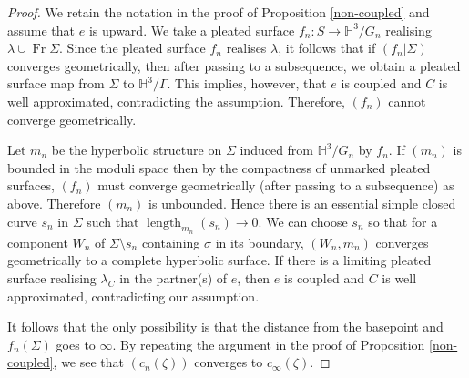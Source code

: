 \documentclass{amsart}
\theoremstyle{definition}
\newcommand{\Fr}{\operatorname{Fr}}
\newcommand\HHH{{\mathbb H}}
\newcommand\length{\operatorname{length}}
\begin{document}
\begin{proof}
We retain the notation in the proof of  Proposition \ref{non-coupled} and assume that $e$ is upward. 
We take a pleated surface $f_n\colon S \to \HHH^3/G_n$ realising $\lambda\cup \Fr \Sigma$.
Since the pleated surface $f_n$ realises $\lambda$, it follows that if $(f_n|\Sigma)$ converges geometrically, then after passing to a subsequence, we obtain a pleated surface map from $\Sigma$ to $\HHH^3/\Gamma$. This implies, however, that $e$ is coupled and $C$ is well approximated, contradicting the assumption.
Therefore, $(f_n)$ cannot converge geometrically.

Let $m_n$ be the hyperbolic structure on $\Sigma$ induced from $\HHH^3/G_n$ by $f_n$.
If $(m_n)$ is bounded in the moduli space then by the compactness of unmarked pleated surfaces, $(f_n)$ must converge geometrically  (after passing to a subsequence) as above.
Therefore $(m_n)$ is unbounded. Hence there is an essential simple closed curve $s_n$ in $\Sigma$ such that $\length_{m_n}(s_n) \to 0$.
We can choose  $s_n$ so that for a component $W_n$ of  $\Sigma \setminus s_n$ containing $\sigma$ in its boundary, $(W_n, m_n)$ converges geometrically to a complete hyperbolic surface.
If there is a limiting pleated surface realising $\lambda_C$ in the partner(s) of $e$, then $e$ is coupled and $C$ is well approximated, contradicting our assumption.


It follows that the only possibility is that  the distance from the basepoint and $f_n(\Sigma)$ goes to $\infty$.
By repeating the argument in the proof of Proposition \ref{non-coupled}, we see that $(c_n(\zeta))$ converges to $c_\infty(\zeta)$.
\end{proof}
%
%
%
\end{document}
